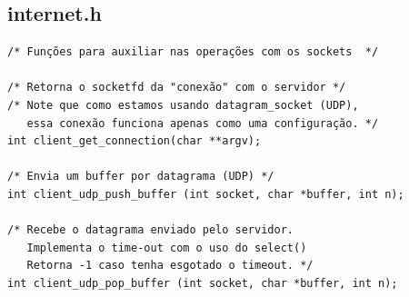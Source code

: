 \documentclass[11pt,twoside]{article}
\begin{document}
\subsection{internet.h}
\begin{verbatim}
/* Funções para auxiliar nas operações com os sockets  */

/* Retorna o socketfd da "conexão" com o servidor */
/* Note que como estamos usando datagram_socket (UDP),
   essa conexão funciona apenas como uma configuração. */
int client_get_connection(char **argv);

/* Envia um buffer por datagrama (UDP) */
int client_udp_push_buffer (int socket, char *buffer, int n);

/* Recebe o datagrama enviado pelo servidor. 
   Implementa o time-out com o uso do select() 
   Retorna -1 caso tenha esgotado o timeout. */
int client_udp_pop_buffer (int socket, char *buffer, int n);
\end{verbatim}
\end{document}
